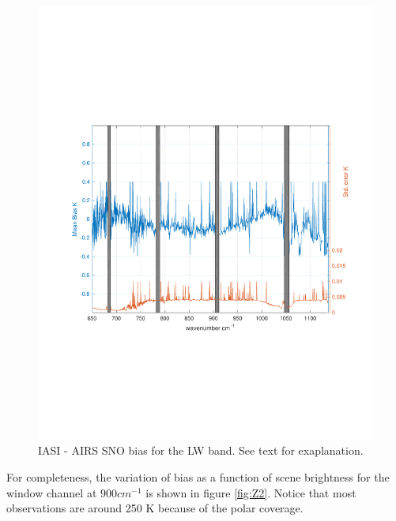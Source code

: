 \documentclass[twocolumn,10pt]{article}
\begin{document}
\begin{figure}[htb]
\centering
\includegraphics[width=.\linewidth]{./figs/fig1.pdf}
\caption{\label{fig:orgparagraph19}
  IASI - AIRS SNO bias for the LW band. See text for exaplanation.}
\label{fig:Z1}
\end{figure}

For completeness, the variation of bias as a function of scene brightness for the window channel at $ 900 cm^{-1} $ is shown in figure \ref{fig:Z2}. Notice that most observations are around 250 K because of the polar coverage.
\end{document}
